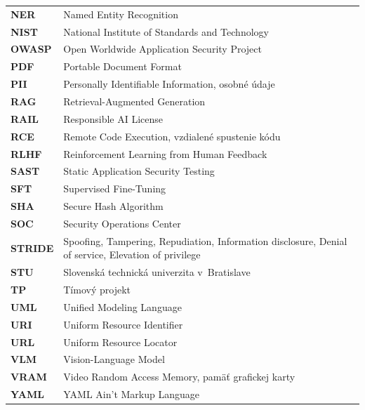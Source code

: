 \begin{longtable}{@{}>{\bfseries}p{3.9cm}@{}>{\raggedright\arraybackslash}p{\dimexpr\textwidth-3.9cm\relax}@{}}
    NER         & Named Entity Recognition \\
    NIST        & National Institute of Standards and Technology \\
    OWASP       & Open Worldwide Application Security Project \\
    PDF         & Portable Document Format \\
    PII         & Personally Identifiable Information, osobné údaje \\
    RAG         & Retrieval-Augmented Generation \\
    RAIL        & Responsible AI License \\
    RCE         & Remote Code Execution, vzdialené spustenie kódu \\
    RLHF        & Reinforcement Learning from Human Feedback \\
    SAST        & Static Application Security Testing \\
    SFT         & Supervised Fine-Tuning \\
    SHA         & Secure Hash Algorithm \\
    SOC         & Security Operations Center \\
    STRIDE      & Spoofing, Tampering, Repudiation, Information disclosure, Denial of service, Elevation of privilege \\
    STU         & Slovenská technická univerzita v~Bratislave \\
    TP          & Tímový projekt \\
    UML         & Unified Modeling Language \\
    URI         & Uniform Resource Identifier \\
    URL         & Uniform Resource Locator \\
    VLM         & Vision-Language Model \\
    VRAM        & Video Random Access Memory, pamäť grafickej karty \\
    YAML        & YAML Ain't Markup Language \\
\end{longtable}
